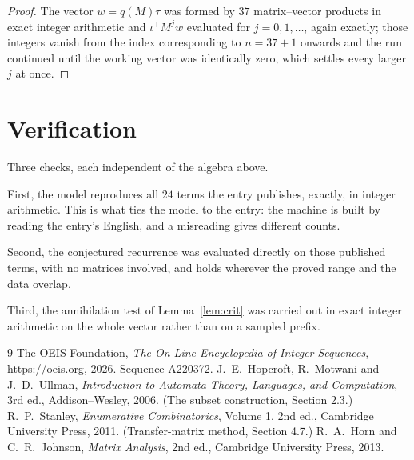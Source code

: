 \documentclass[11pt,a4paper]{article}
\theoremstyle{plain}
\theoremstyle{definition}
\begin{document}
\begin{proof}
The vector $w=q(M)\tau$ was formed by $37$ matrix--vector products in exact integer
arithmetic and $\iota^{\!\top}M^{j}w$ evaluated for $j=0,1,\dots$, again exactly; those
integers vanish from the index corresponding to $n=37+1$ onwards and the run continued
until the working vector was identically zero, which settles every larger $j$ at once.
\end{proof}

\section{Verification}

Three checks, each independent of the algebra above.

First, the model reproduces all $24$ terms the entry publishes, exactly, in integer
arithmetic. This is what ties the model to the entry: the machine is built by reading the
entry's English, and a misreading gives different counts.

Second, the conjectured recurrence was evaluated directly on those published terms, with no
matrices involved, and holds wherever the proved range and the data overlap.

Third, the annihilation test of Lemma~\ref{lem:crit} was carried out in exact integer
arithmetic on the whole vector rather than on a sampled prefix.

\begin{thebibliography}{9}
 The OEIS Foundation, \emph{The On-Line Encyclopedia of Integer
Sequences}, \url{https://oeis.org}, 2026. Sequence A220372.
 J.~E.~Hopcroft, R.~Motwani and J.~D.~Ullman, \emph{Introduction to Automata
Theory, Languages, and Computation}, 3rd ed., Addison--Wesley, 2006. (The subset
construction, Section 2.3.)
 R.~P.~Stanley, \emph{Enumerative Combinatorics}, Volume 1, 2nd ed.,
Cambridge University Press, 2011. (Transfer-matrix method, Section 4.7.)
 R.~A.~Horn and C.~R.~Johnson, \emph{Matrix Analysis}, 2nd ed., Cambridge
University Press, 2013.
\end{thebibliography}
\end{document}
